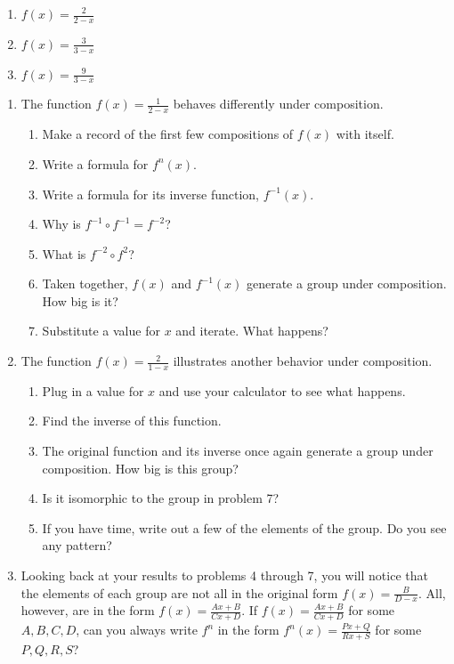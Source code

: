 \documentclass[../gatm_answers.tex]{subfiles}
\begin{document}
\begin{multicols}{3}
\begin{enumerate}
\setcounter{enumi}{\value{problem_i}}
\item \label{prob:compose_start}$f(x)=\frac{2}{2-x}$
\item $f(x)=\frac{3}{3-x}$
\item \label{prob:compose_end}$f(x)=\frac{9}{3-x}$
\setcounter{problem_i}{\value{enumi}}
\end{enumerate}
\end{multicols}
\begin{enumerate}
\setcounter{enumi}{\value{problem_i}}
\item The function $f(x)=\frac{1}{2-x}$ behaves differently under composition.
\begin{enumerate}
\item Make a record of the first few compositions of $f(x)$ with itself.
\item Write a formula for $f^n(x)$.
\item Write a formula for its inverse function, $f^{-1}(x)$.
\item Why is $f^{-1}\circ f^{-1}=f^{-2}$?
\item What is $f^{-2}\circ f^2$?
\item Taken together, $f(x)$ and $f^{-1}(x)$ generate a group under composition. How big is it?
\item Substitute a value for $x$ and iterate. What happens?
\end{enumerate}
\item The function $f(x)=\frac{2}{1-x}$ illustrates another behavior under composition.
\begin{enumerate}
\item Plug in a value for $x$ and use your calculator to see what happens.
\item Find the inverse of this function.
\item The original function and its inverse once again generate a group under composition. How big is this group?
\item Is it isomorphic to the group in problem 7?
\item If you have time, write out a few of the elements of the group. Do you see any pattern?
\end{enumerate}
\item Looking back at your results to problems 4 through 7, you will notice that the elements of each group are not all in the original form $f(x)=\frac{B}{D-x}$. All, however, are in the form $f(x)=\frac{Ax+B}{Cx+D}$. If $f(x)=\frac{Ax+B}{Cx+D}$ for some $A,B,C,D$, can you always write $f^n$ in the form $f^n(x)=\frac{Px+Q}{Rx+S}$ for some $P,Q,R,S$?
\setcounter{problem_i}{\value{enumi}}
\end{enumerate}
\end{document}
